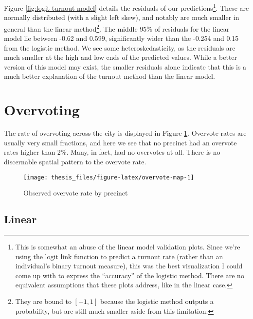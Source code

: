 \documentclass[12pt,twoside]{reedthesis}
\begin{document}
Figure \ref{fig:logit-turnout-model} details the residuals of our predictions\footnote{This is somewhat an abuse of the linear model validation plots. Since we're using the logit link function to predict a turnout rate (rather than an individual's binary turnout measure), this was the best visualization I could come up with to express the ``accuracy'' of the logistic method. There are no equivalent assumptions that these plots address, like in the linear case.}. These are normally distributed (with a slight left skew), and notably are much smaller in general than the linear method\footnote{They are bound to \([-1,1]\) because the logistic method outputs a probability, but are still much smaller aside from this limitation.}. The middle 95\% of residuals for the linear model lie between -0.62 and 0.599, significantly wider than the -0.254 and 0.15 from the logistic method. We see some heteroskedasticity, as the residuals are much smaller at the high and low ends of the predicted values. While a better version of this model may exist, the smaller residuals alone indicate that this is a much better explanation of the turnout method than the linear model.

\hypertarget{overvoting}{%
\section{Overvoting}\label{overvoting}}

The rate of overvoting across the city is displayed in Figure \ref{fig:overvote-map}. Overvote rates are usually very small fractions, and here we see that no precinct had an overvote rates higher than 2\%. Many, in fact, had no overvotes at all. There is no discernable spatial pattern to the overvote rate.
\begin{figure}
\texttt{[image: thesis\_files/figure-latex/overvote-map-1]} \caption{Observed overvote rate by precinct}\label{fig:overvote-map}
\end{figure}
\hypertarget{linear-1}{%
\subsection{Linear}\label{linear-1}}
\end{document}
